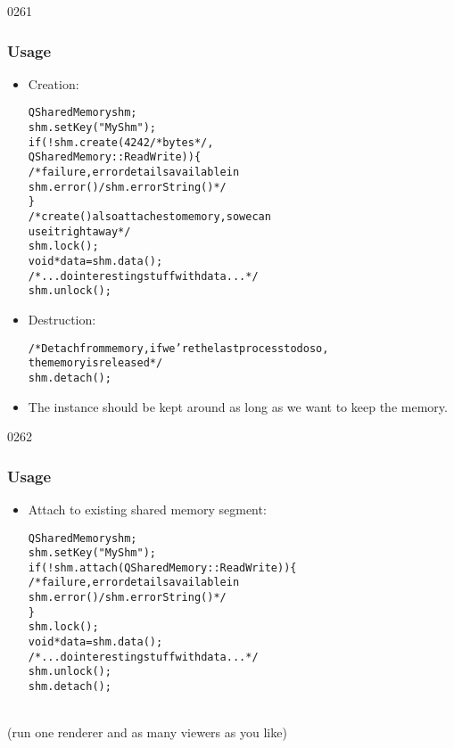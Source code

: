 \begin{slide}[fragile]{0261}
\frametitle{Usage}
  \begin{itemize}
  \item Creation:
  \begin{center}
\tiny
\begin{alltt}
QSharedMemory shm;
shm.setKey("MyShm");
if( !shm.create( 4242 /*bytes*/,
                 QSharedMemory::ReadWrite ) ) \{
    /* failure, error details available in
       shm.error()/shm.errorString() */
\}
/* create() also attaches to memory, so we can
use it right away */
shm.lock();
void* data = shm.data();
/* ... do interesting stuff with data... */
shm.unlock();
\end{alltt}
  \end{center}
\item Destruction:
  \begin{center}
\tiny
\begin{alltt}
/* Detach from memory, if we're the last process to do so,
the memory is released */
shm.detach();
\end{alltt}
  \end{center}
\item The  instance should be kept around as long as we want to keep the memory.
  \end{itemize}
\end{slide}

\begin{slide}[fragile]{0262}
\frametitle{Usage}
  \begin{itemize}
  \item Attach to existing shared memory segment:
  \begin{center}
\tiny
\begin{alltt}
QSharedMemory shm;
shm.setKey("MyShm");
if( !shm.attach( QSharedMemory::ReadWrite ) ) \{
    /* failure, error details available in
       shm.error()/shm.errorString() */
\}
shm.lock();
void* data = shm.data();
/* ... do interesting stuff with data... */
shm.unlock();
shm.detach();
\end{alltt}
  \end{center}
  \end{itemize}
\\
(run one renderer and as many viewers as you like)
\end{slide}

